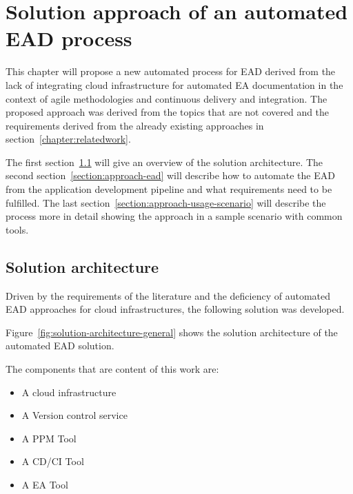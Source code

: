\chapter{Solution approach of an automated EAD process}\label{chapter:approach}

This chapter will propose a new automated process for EAD derived from the lack of integrating cloud infrastructure for automated EA documentation in the context of agile methodologies and continuous delivery and integration. The proposed approach was derived from the topics that are not covered and the requirements derived from the already existing approaches in section~\ref{chapter:relatedwork}.

The first section~\ref{section:solution-architecture} will give an overview of the solution architecture. The second section~\ref{section:approach-ead} will describe how to automate the EAD from the application development pipeline and what requirements need to be fulfilled. The last section~\ref{section:approach-usage-scenario} will describe the process more in detail showing the approach in a sample scenario with common tools.

\section{Solution architecture}\label{section:solution-architecture}

Driven by the requirements of the literature and the deficiency of automated EAD approaches for cloud infrastructures, the following solution was developed.

Figure~\ref{fig:solution-architecture-general} shows the solution architecture of the automated EAD solution. 

The components that are content of this work are:
\begin{itemize}
    \item A cloud infrastructure
    \item A Version control service
    \item A PPM Tool
    \item A CD/CI Tool
    \item A EA Tool
\end{itemize}

